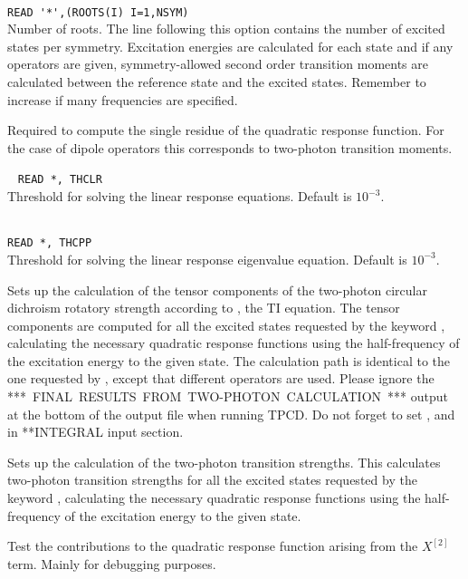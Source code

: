 \begin{description}
\item{}\\
\verb|READ '*',(ROOTS(I) I=1,NSYM)|\\
Number of roots.  The line following this option contains the number
of excited states per symmetry. Excitation
energies are calculated for each state and if
any operators are given,
symmetry-allowed second order transition moments are
calculated between the
reference state and the excited states.
Remember to increase  if many frequencies are specified.

\item{}
Required to
compute the single residue of the quadratic
response function.
For the case of dipole operators this corresponds to two-photon
transition
moments.

\item{}\verb| |\newline
\verb|READ *, THCLR|\\
Threshold for solving the linear response equations.
Default is $10^{-3}$.

\item{}\\
\verb|READ *, THCPP|\\
Threshold for solving the linear response
eigenvalue equation. Default is $10^{-3}$.

\item{}
Sets up the calculation of the tensor components of the two-photon circular dichroism rotatory
strength according to \cite{Rizzo:TPACD}, the TI equation.
The tensor components are computed for all the excited states
requested by the keyword , calculating the necessary
quadratic response functions using the half-frequency of the
excitation energy to the given state. The calculation path is identical to the
one requested by , except that different operators are used.
Please ignore the \mbox{***~FINAL~RESULTS~FROM~TWO-PHOTON~CALCULATION~***} output
at the bottom of the output file when running TPCD.
Do not forget to set ,  and  in **INTEGRAL
input section.


\item{}
Sets up the calculation of the two-photon transition strengths. This
calculates two-photon transition strengths for all the excited states
requested by the keyword , calculating the necessary
quadratic response functions using the half-frequency of the
excitation energy to the given state.

\item{}
Test the contributions to the quadratic response function arising from
the $X^{\left[2\right]}$ term. Mainly for debugging purposes.
\end{description}


